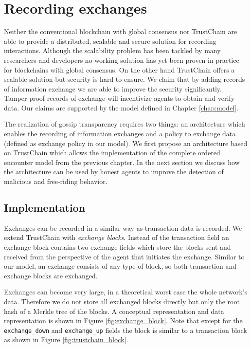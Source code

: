 \chapter{Recording exchanges}
\label{sec:extension}
Neither the conventional blockchain with global consensus nor TrustChain are able to provide a 
distributed, scalable and secure solution for recording interactions. Although the scalability 
problem has been tackled by many researchers and developers\cite{poon2016bitcoin, luu2016secure}
no working solution has yet been proven in practice for blockchains with global consensus. On the 
other hand TrustChain offers a scalable solution but security is hard to ensure. We claim that by 
adding records of information exchange we are able to improve the security significantly. 
Tamper-proof records of exchange will incentivize agents to 
obtain and verify data. Our claims are supported by the model defined in Chapter \ref{chap:model}.

The realization of gossip transparency requires two things: an architecture which enables the 
recording of information exchanges and a policy to exchange data (defined as exchange policy in 
our model). We first propose an architecture based on TrustChain which allows the implementation 
of the complete ordered encounter model from the previous chapter. In the next section we discuss
how the architecture can be used by honest agents to improve the detection of malicious and free-riding 
behavior.

\section{Implementation}
Exchanges can be recorded in a similar way as transaction data is recorded. We extend TrustChain with \textit{exchange blocks}. Instead of the transaction
field an exchange block contains two exchange fields which store the blocks sent and received from the perspective of
the agent that initiates the exchange. Similar to our model, an exchange consists of any type of block, so both transaction and exchange 
blocks are exchanged. 

Exchanges can become very large, in a theoretical 
worst case the whole network's data. Therefore we do not store all exchanged blocks directly but only
the root hash of a Merkle tree of the blocks. A conceptual representation and data representation 
is shown in Figure \ref{fig:exchange_block}. Note that except for the \verb|exchange_down| and \verb|exchange_up|
fields the block is similar to a transaction block as shown in Figure \ref{fig:trustchain_block}. 

